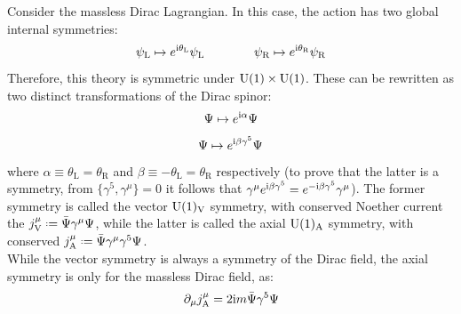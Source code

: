 Consider the massless Dirac Lagrangian. In this case, the action has two global internal symmetries:
\begin{equation*}
  \psi_\text{L} \mapsto e^{\mathrm{i} \theta_\text{L}} \psi_\text{L}
  \qquad \qquad
  \psi_\text{R} \mapsto e^{\mathrm{i} \theta_\text{R}} \psi_\text{R}
\end{equation*}
Therefore, this theory is symmetric under $ \mathrm{U}(1) \times \mathrm{U}(1) $. These can be rewritten as two distinct transformations of the Dirac spinor:
\begin{equation}
  \Psi \mapsto e^{\mathrm{i} \alpha} \Psi
  \label{eq:dirac-u1-symm}
\end{equation}
\begin{equation}
  \Psi \mapsto e^{\mathrm{i} \beta \gamma^5} \Psi
\end{equation}
where $ \alpha \equiv \theta_\text{L} = \theta_\text{R} $ and $ \beta \equiv - \theta_\text{L} = \theta_\text{R} $ respectively (to prove that the latter is a symmetry, from $ \{\gamma^5, \gamma^\mu\} = 0 $ it follows that $ \gamma^\mu e^{\mathrm{i} \beta \gamma^5} = e^{-\mathrm{i} \beta \gamma^5} \gamma^\mu $). The former symmetry is called the vector $ \mathrm{U}(1)_\text{V} $ symmetry, with conserved Noether current the  $ j^\mu_\text{V} \defeq \bar{\Psi} \gamma^\mu \Psi $, while the latter is called the axial $ \mathrm{U}(1)_\text{A} $ symmetry, with conserved  $ j^\mu_\text{A} \defeq \bar{\Psi} \gamma^\mu \gamma^5 \Psi $.\\
While the vector symmetry is always a symmetry of the Dirac field, the axial symmetry is only for the massless Dirac field, as:
\begin{equation}
  \partial_\mu j^\mu_\text{A} = 2 \mathrm{i} m \bar{\Psi} \gamma^5 \Psi
\end{equation}










